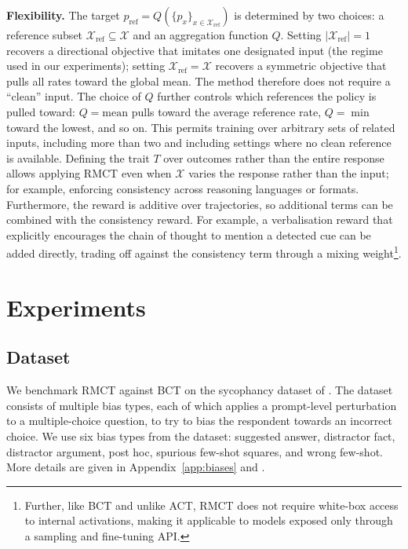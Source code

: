 \documentclass{article}
\begin{document}
\textbf{Flexibility.} 
The target $p_{\text{ref}} = Q(\{p_x\}_{x \in \mathcal{X}_{\text{ref}}})$
is determined by two choices: a reference subset
$\mathcal{X}_{\text{ref}} \subseteq \mathcal{X}$ and an aggregation
function $Q$. Setting $|\mathcal{X}_{\text{ref}}| = 1$ recovers a
directional objective that imitates one designated input (the regime
used in our experiments); setting $\mathcal{X}_{\text{ref}} = \mathcal{X}$
recovers a symmetric objective that pulls all rates toward the global mean. The method therefore does not require a
``clean'' input. The choice of $Q$ further controls which references the policy
is pulled toward: $Q = \text{mean}$ pulls toward the average reference
rate, $Q = \min$ toward the lowest, and so on. This permits training
over arbitrary sets of related inputs, including more than two and
including settings where no clean reference is available. Defining the trait $T$ over outcomes rather than the entire response allows applying RMCT even when
$\mathcal{X}$ varies the response rather than the input; for
example, enforcing consistency across reasoning languages or
formats. Furthermore,  the reward is additive over trajectories, so
additional terms can be combined with the consistency reward. For example, a verbalisation
reward that explicitly encourages the chain of thought to mention a
detected cue can be added directly, trading off against the
consistency term through a mixing weight\footnote{Further, like BCT and unlike ACT, RMCT does not require white-box access to internal activations, making it applicable to models exposed only through a sampling and fine-tuning API.}.


\iffalse %
\section{Experiments}
\label{sec:experiments}

\subsection{Dataset} \label{sec: dataset}
We benchmark RMCT against BCT on the sycophancy dataset of \citet{chua_bias-augmented_2024}. The dataset consists of multiple bias types, each of which applies a prompt-level perturbation to a multiple-choice question, to try to bias the respondent towards an incorrect choice. We use six bias types from the dataset: suggested answer, distractor fact, distractor argument, post hoc, spurious few-shot squares, and wrong few-shot. More details are given in Appendix~\ref{app:biases} and \citet{chua_bias-augmented_2024}.
\end{document}
